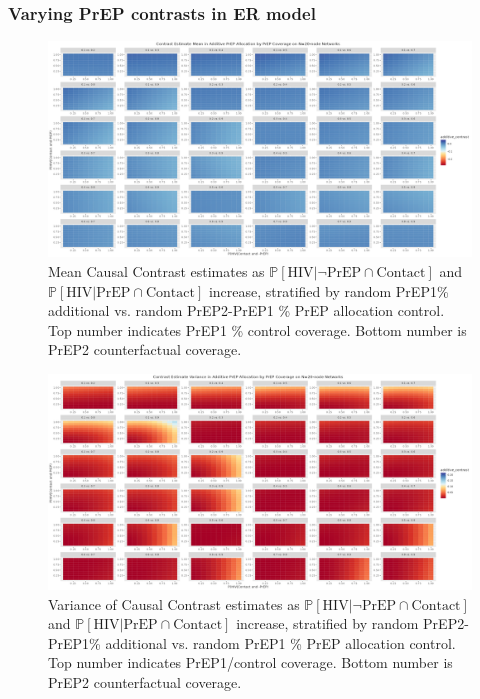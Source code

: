 \documentclass{article}
\theoremstyle{definition}
\begin{document}
\subsubsection{Varying PrEP contrasts in ER model}
\begin{figure}[H]
    \centering
    \includegraphics[width=\linewidth]{Corrected Figures/PrEP Additive Mean Plots.png}
    \caption{Mean Causal Contrast estimates as $\mathbb{P}\left[\text{HIV} \vert \neg \text{PrEP} \cap \text{Contact}\right]$ and $\mathbb{P}\left[\text{HIV} \vert \text{PrEP} \cap \text{Contact}\right]$ increase, stratified by random PrEP1\% additional vs. random PrEP2-PrEP1 \% PrEP allocation control. Top number indicates PrEP1 \% control coverage. Bottom number is PrEP2 counterfactual coverage. }
    \label{fig:Figure S4.11}
\end{figure}
\begin{figure}[H]
    \centering
    \includegraphics[width=\linewidth]{Corrected Figures/PrEP Additive Variance Plots.png}
    \caption{Variance of Causal Contrast estimates as $\mathbb{P}\left[\text{HIV} \vert \neg \text{PrEP} \cap \text{Contact}\right]$ and $\mathbb{P}\left[\text{HIV} \vert \text{PrEP} \cap \text{Contact}\right]$ increase, stratified by random PrEP2-PrEP1\% additional vs. random PrEP1 \% PrEP allocation control. Top number indicates PrEP1/control coverage. Bottom number is PrEP2 counterfactual coverage.}
    \label{fig:Figure S4.12}
\end{figure}
\end{document}
